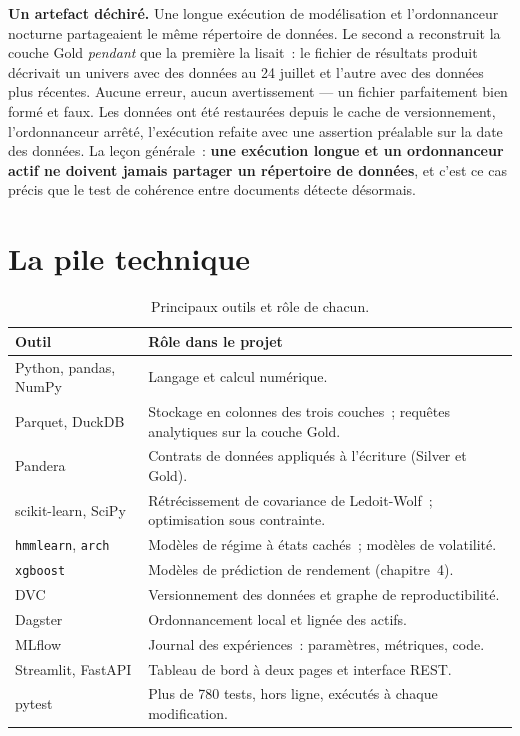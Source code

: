 \textbf{Un artefact déchiré.} Une longue exécution de modélisation et
l'ordonnanceur nocturne partageaient le même répertoire de données. Le second a
reconstruit la couche Gold \emph{pendant} que la première la lisait~: le fichier
de résultats produit décrivait un univers avec des données au 24 juillet et
l'autre avec des données plus récentes. Aucune erreur, aucun avertissement — un
fichier parfaitement bien formé et faux. Les données ont été restaurées depuis le
cache de versionnement, l'ordonnanceur arrêté, l'exécution refaite avec une
assertion préalable sur la date des données. La leçon générale~: \textbf{une
exécution longue et un ordonnanceur actif ne doivent jamais partager un
répertoire de données}, et c'est ce cas précis que le test de cohérence entre
documents détecte désormais.

\section{La pile technique}

\begin{table}[htbp]
  \centering
  \small
  \caption[Pile technique]{Principaux outils et rôle de chacun.}
  \label{tab:pile}
  \begin{tabular}{@{}p{3.3cm}p{9.2cm}@{}}
    \toprule
    \textbf{Outil} & \textbf{Rôle dans le projet} \\
    \midrule
    Python, pandas, NumPy & Langage et calcul numérique. \\
    Parquet, DuckDB & Stockage en colonnes des trois couches~; requêtes
    analytiques sur la couche Gold. \\
    Pandera & Contrats de données appliqués à l'écriture (Silver et Gold). \\
    scikit-learn, SciPy & Rétrécissement de covariance de Ledoit-Wolf~;
    optimisation sous contrainte. \\
    \texttt{hmmlearn}, \texttt{arch} & Modèles de régime à états cachés~;
    modèles de volatilité. \\
    \texttt{xgboost} & Modèles de prédiction de rendement (chapitre~4). \\
    DVC & Versionnement des données et graphe de reproductibilité. \\
    Dagster & Ordonnancement local et lignée des actifs. \\
    MLflow & Journal des expériences~: paramètres, métriques, code. \\
    Streamlit, FastAPI & Tableau de bord à deux pages et interface REST. \\
    pytest & Plus de 780 tests, hors ligne, exécutés à chaque modification. \\
    \bottomrule
  \end{tabular}
\end{table}

